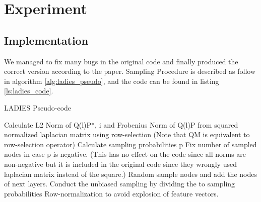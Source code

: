 \chapter{Experiment}

\section{Implementation}
We managed to fix many bugs in the original code and finally produced the correct version according to the paper. Sampling Procedure is described as follow in algorithm \ref{alg:ladies_pseudo}, and the code can be found in listing \ref{ls:ladies_code}.

\begin{algorithm}[H]
	\caption{LADIES Pseudo-code}
	\begin{algorithmic}[1]
        \State Calculate L2 Norm of Q(l)P*, i and Frobenius Norm of Q(l)P from squared normalized laplacian matrix using row-selection (Note that QM is equivalent to row-selection operator)
        \State Calculate sampling probabilities p
        \State Fix number of sampled nodes in case p is negative. (This has no effect on the code since all norms are non-negative but it is included in the original code since they wrongly used laplacian matrix instead of the square.)
        \State Random sample nodes and add the nodes of next layers.
        \State Conduct the unbiased sampling by dividing the to sampling probabilities
        \State Row-normalization to avoid explosion of feature vectors.
        \EndFor
    \end{algorithmic}
    \label{alg:ladies_pseudo}
\end{algorithm}

